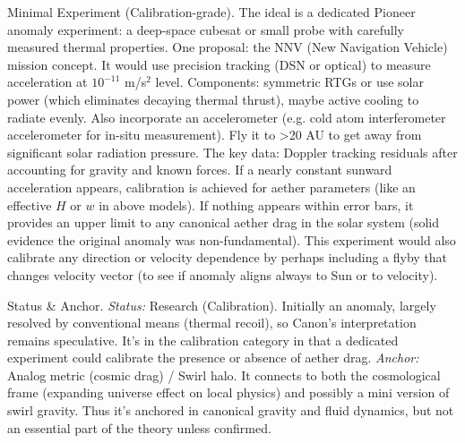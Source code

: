 \documentclass[11pt]{article}
\begin{document}
Minimal Experiment (Calibration-grade). The ideal is a dedicated Pioneer anomaly experiment: a deep-space cubesat or small probe with carefully measured thermal properties. One proposal: the NNV (New Navigation Vehicle) mission concept. It would use precision tracking (DSN or optical) to measure acceleration at $10^{-11}$ m/s$^2$ level. Components: symmetric RTGs or use solar power (which eliminates decaying thermal thrust), maybe active cooling to radiate evenly. Also incorporate an accelerometer (e.g. cold atom interferometer accelerometer for in-situ measurement). Fly it to >20 AU to get away from significant solar radiation pressure. The key data: Doppler tracking residuals after accounting for gravity and known forces. If a nearly constant sunward acceleration appears, calibration is achieved for aether parameters (like an effective $H$ or $w$ in above models). If nothing appears within error bars, it provides an upper limit to any canonical aether drag in the solar system (solid evidence the original anomaly was non-fundamental). This experiment would also calibrate any direction or velocity dependence by perhaps including a flyby that changes velocity vector (to see if anomaly aligns always to Sun or to velocity).


Status & Anchor. \textit{Status:} Research (Calibration). Initially an anomaly, largely resolved by conventional means (thermal recoil), so Canon’s interpretation remains speculative. It’s in the calibration category in that a dedicated experiment could calibrate the presence or absence of aether drag. \textit{Anchor:} Analog metric (cosmic drag) / Swirl halo. It connects to both the cosmological frame (expanding universe effect on local physics) and possibly a mini version of swirl gravity. Thus it’s anchored in canonical gravity and fluid dynamics, but not an essential part of the theory unless confirmed.
\end{document}
